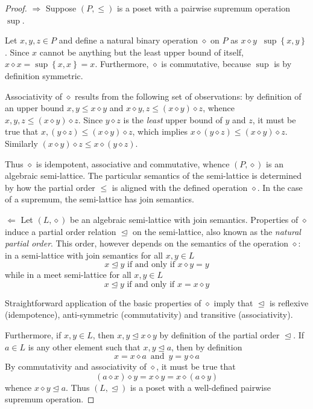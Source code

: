 \documentclass[a4paper]{article}
\newcommand{\obj}[1]{{\left\{ #1 \right \}}}
\newcommand{\brac}[1]{{\left ( #1 \right )}}
\newcommand{\defn}{\mathop{\overset{\Delta}{=}}\nolimits}
\begin{document}
\begin{proof}
$\Rightarrow$ Suppose $(P,\leq)$ is a poset with a pairwise supremum operation $\sup$.

Let $x,y,z\in P$ and define a natural binary operation $\diamond$ on $P$ as $x\diamond y \defn \sup\obj{x,y}$. Since $x$ cannot be anything but the least upper bound of itself, $x\diamond x=\sup\obj{x,x}=x$. Furthermore, $\diamond$ is commutative, because $\sup$ is by definition symmetric.

Associativity of $\diamond$ results from the following set of observations: by definition of an upper bound $x,y\leq x\diamond y$ and $x\diamond y,z \leq \brac{x\diamond y}\diamond z$, whence $x,y,z \leq \brac{x\diamond y}\diamond z$. Since $y\diamond z$ is the \emph{least} upper bound of $y$ and $z$, it must be true that $x, (y\diamond z) \leq \brac{x\diamond y}\diamond z$, which implies $x\diamond\brac{y\diamond z} \leq \brac{x\diamond y}\diamond z$. Similarly $\brac{x\diamond y}\diamond z\leq x\diamond\brac{y\diamond z}$.

Thus $\diamond$ is idempotent, associative and commutative, whence $(P,\diamond)$ is an algebraic semi-lattice. The particular semantics of the semi-lattice is determined by how the partial order $\leq$ is aligned with the defined operation $\diamond$. In the case of a supremum, the semi-lattice has join semantics.

$\Leftarrow$ Let $(L,\diamond)$ be an algebraic semi-lattice with join semantics. Properties of $\diamond$ induce a partial order relation $\trianglelefteq$ on the semi-lattice, also known as the \emph{natural partial order}. This order, however depends on the semantics of the operation $\diamond$: in a semi-lattice with join semantics for all $x,y\in L$ \[x \trianglelefteq y\text{ if and only if } x\diamond y = y\] while in a meet semi-lattice for all $x,y\in L$ \[x \trianglelefteq y\text{ if and only if } x = x\diamond y\]
	
Straightforward application of the basic properties of $\diamond$ imply that $\trianglelefteq$ is reflexive (idempotence), anti-symmetric (commutativity) and transitive (associativity).

Furthermore, if $x,y\in L$, then $x,y\trianglelefteq x\diamond y$ by definition of the partial order $\trianglelefteq$. If $a\in L$ is any other element such that $x,y\trianglelefteq a$, then by definition \[x = x \diamond a\,\text{ and }\, y = y\diamond a\] By commutativity and associativity of $\diamond$, it must be true that \[(a\diamond x) \diamond y = x\diamond y = x\diamond (a\diamond y)\] whence $x\diamond y\trianglelefteq a$. Thus $(L,\trianglelefteq)$ is a poset with a well-defined pairwise supremum operation.

\end{proof}
\end{document}
